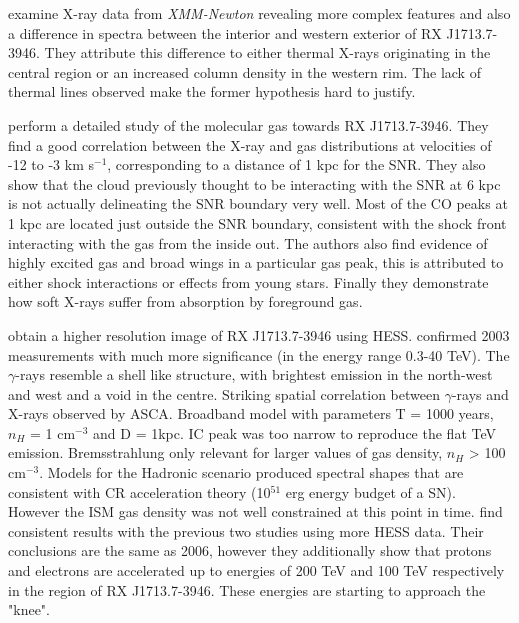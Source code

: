 \documentclass[12pt,a4paper]{article}
\begin{document}
\cite{2005A&A...431..953H} examine X-ray data from \textit{XMM-Newton} revealing more complex features and also a difference in spectra between the interior and western exterior of RX J1713.7-3946. They attribute this difference to either thermal X-rays originating in the central region or an increased column density in the western rim. The lack of thermal lines observed make the former hypothesis hard to justify. 

\cite{2005ApJ...631..947M} perform a detailed study of the molecular gas towards RX J1713.7-3946. They find a good correlation between the X-ray and gas distributions at velocities of -12 to -3 km s$^{-1}$, corresponding to a distance of 1 kpc for the SNR. They also show that the cloud previously thought to be interacting with the SNR at 6 kpc \citep{1999ApJ...525..357S} is not actually delineating the SNR boundary very well. Most of the CO peaks at 1 kpc are located just outside the SNR boundary, consistent with the shock front interacting with the gas from the inside out. The authors also find evidence of highly excited gas and broad wings in a particular gas peak, this is attributed to either shock interactions or effects from young stars. Finally they demonstrate how soft X-rays suffer from absorption by foreground gas. 

\cite{2004Natur.432...75A} obtain a higher resolution image of RX J1713.7-3946 using HESS. 
\cite{2006A&A...449..223A} confirmed 2003 measurements with much more significance (in the energy range 0.3-40 TeV). The $\gamma$-rays resemble a shell like structure, with brightest emission in the north-west and west and a void in the centre. Striking spatial correlation between $\gamma$-rays and X-rays observed by ASCA. Broadband model with parameters T = 1000 years, $n_H$ = 1 cm$^{-3}$ and D = 1kpc. IC peak was too narrow to reproduce the flat TeV emission. Bremsstrahlung only relevant for larger values of gas density, $n_H$ > 100 cm$^{-3}$. Models for the Hadronic scenario produced spectral shapes that are consistent with CR acceleration theory (10$^{51}$ erg energy budget of a SN). However the ISM gas density was not well constrained at this point in time. 
\cite{2007A&A...464..235A} find consistent results with the previous two studies using more HESS data. Their conclusions are the same as 2006, however they additionally show that protons and electrons are accelerated up to energies of 200 TeV and 100 TeV respectively in the region of RX J1713.7-3946. These energies are starting to approach the "knee". 
\end{document}

